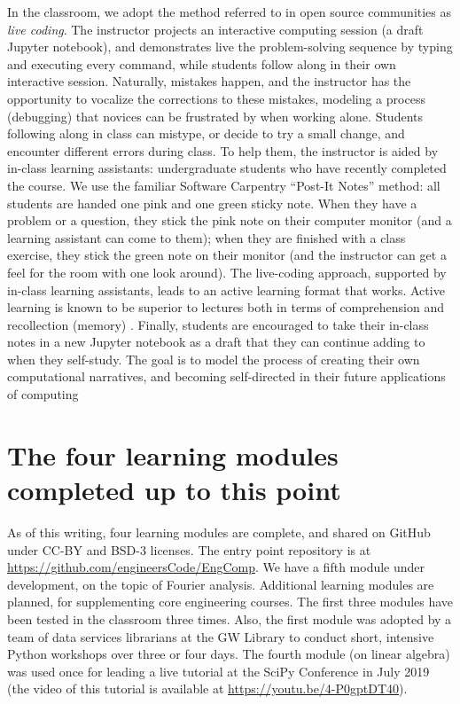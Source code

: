 \documentclass[10pt,journal,compsoc]{IEEEtran}
\begin{document}
In the classroom, we adopt the method referred to in open source communities as \emph{live coding}. 
The instructor projects an interactive computing session (a draft Jupyter notebook), and demonstrates live the problem-solving sequence by typing and executing every command, while students follow along in their own interactive session. 
Naturally, mistakes happen, and the instructor has the opportunity to vocalize the corrections to these mistakes, modeling a process (debugging) that novices can be frustrated by when working alone. 
Students following along in class can mistype, or decide to try a small change, and encounter different errors during class. To help them, the instructor is aided by in-class learning assistants: undergraduate students who have recently completed the course. 
We use the familiar Software Carpentry ``Post-It Notes'' method: all students are handed one pink and one green sticky note. 
When they have a problem or a question, they stick the pink note on their computer monitor (and a learning assistant can come to them); when they are finished with a class exercise, they stick the green note on their monitor (and the instructor can get a feel for the room with one look around).
The live-coding approach, supported by in-class learning assistants, leads to an active learning format that works. 
Active learning is known to be superior to lectures both in terms of comprehension and recollection (memory) \cite{freeman2014active}.
Finally, students are encouraged to take their in-class notes in a new Jupyter notebook as a draft that they can continue adding to when they self-study. 
The goal is to model the process of creating their own computational narratives, and becoming self-directed in their future applications of computing

\section{The four learning modules completed up to this point}
As of this writing, four learning modules are complete, and shared on GitHub under CC-BY and BSD-3 licenses. 
The entry point repository is at \url{https://github.com/engineersCode/EngComp}. 
We have a fifth module under development, on the topic of Fourier analysis. 
Additional learning modules are planned, for supplementing core engineering courses. 
The first three modules have been tested in the classroom three times. 
Also, the first module was adopted by a team of data services librarians at the GW Library to conduct short, intensive Python workshops over three or four days. 
The fourth module (on linear algebra) was used once for leading a live tutorial at the SciPy Conference in July 2019 (the video of this tutorial is available at \url{https://youtu.be/4-P0gptDT40}).
\end{document}
